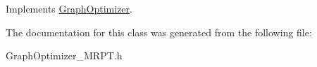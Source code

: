 Implements \hyperlink{class_graph_optimizer_a303a1e4e96fa44433ef48aa4051fab32}{GraphOptimizer}.



The documentation for this class was generated from the following file:\begin{DoxyCompactItemize}
\item 
GraphOptimizer\_\-MRPT.h\end{DoxyCompactItemize}
